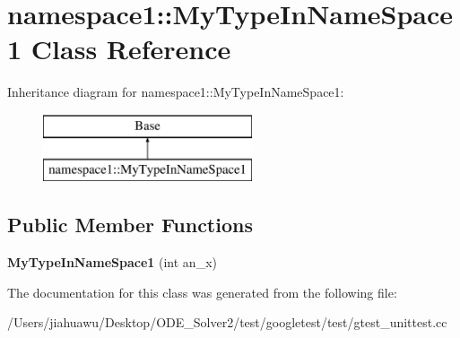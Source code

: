 \hypertarget{classnamespace1_1_1_my_type_in_name_space1}{}\section{namespace1\+:\+:My\+Type\+In\+Name\+Space1 Class Reference}
\label{classnamespace1_1_1_my_type_in_name_space1}
Inheritance diagram for namespace1\+:\+:My\+Type\+In\+Name\+Space1\+:\begin{figure}[H]
\begin{center}
\leavevmode
\includegraphics[height=2.000000cm]{classnamespace1_1_1_my_type_in_name_space1}
\end{center}
\end{figure}
\subsection*{Public Member Functions}
\begin{DoxyCompactItemize}
\item 
\mbox{\label{classnamespace1_1_1_my_type_in_name_space1_a2e4277aa118e9b83045a18392188a0d8}} 
{\bfseries My\+Type\+In\+Name\+Space1} (int an\+\_\+x)
\end{DoxyCompactItemize}


The documentation for this class was generated from the following file\+:\begin{DoxyCompactItemize}
\item 
/\+Users/jiahuawu/\+Desktop/\+O\+D\+E\+\_\+\+Solver2/test/googletest/test/gtest\+\_\+unittest.\+cc\end{DoxyCompactItemize}
